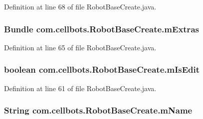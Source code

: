 Definition at line 68 of file Robot\-Base\-Create.\-java.

\hypertarget{classcom_1_1cellbots_1_1_robot_base_create_a55c7d7396c6382fb2c43c03a8326e8de}{
\subsubsection[{m\-Extras}]{\setlength{\rightskip}{0pt plus 5cm}Bundle {\bf com.\-cellbots.\-Robot\-Base\-Create.\-m\-Extras}}}\label{classcom_1_1cellbots_1_1_robot_base_create_a55c7d7396c6382fb2c43c03a8326e8de}


Definition at line 65 of file Robot\-Base\-Create.\-java.

\hypertarget{classcom_1_1cellbots_1_1_robot_base_create_a5093176d9dc3caf9fe69b9acf559a7df}{
\subsubsection[{m\-Is\-Edit}]{\setlength{\rightskip}{0pt plus 5cm}boolean {\bf com.\-cellbots.\-Robot\-Base\-Create.\-m\-Is\-Edit}}}\label{classcom_1_1cellbots_1_1_robot_base_create_a5093176d9dc3caf9fe69b9acf559a7df}


Definition at line 61 of file Robot\-Base\-Create.\-java.

\hypertarget{classcom_1_1cellbots_1_1_robot_base_create_ada07a21cae8d09e6747da5d39d6bfd8e}{
\subsubsection[{m\-Name}]{\setlength{\rightskip}{0pt plus 5cm}String {\bf com.\-cellbots.\-Robot\-Base\-Create.\-m\-Name}}}\label{classcom_1_1cellbots_1_1_robot_base_create_ada07a21cae8d09e6747da5d39d6bfd8e}


